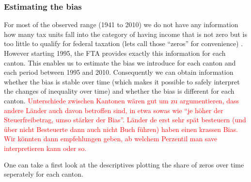 \documentclass[twoside]{article}\usepackage[]{graphicx}\usepackage[]{color}
\begin{document}
\begin{multicols}{2}


\subsubsection{Estimating the bias}
For most of the observed range (1941 to 2010) we do not have any information how many tax units fall into the category of having income that is not zero but is too little to qualify for federal taxation (lets call those ``zeros'' for convenience) . However starting 1995, the FTA provides exactly this information for each canton. This enables us to estimate the bias we introduce for each canton and each period between 1995 and 2010. Consequently we can obtain information whether the bias is stable over time (which makes it possible to safely interpret the changes of inequality over time) and whether the bias is different for each canton. \textcolor{red}{Unterschiede zwischen Kantonen wären gut um zu argumentieren, dass andere Länder auch davon betroffen sind, in etwa sowas wie ``je höher der Steuerfreibetrag, umso stärker der Bias''. Länder de erst sehr spät besteuern (und über nicht Besteuerte dann auch nicht Buch führen) haben einen krassen Bias. Wir könnten dann empfehlungen geben, ab welchem Perzentil man save interpretieren kann oder so.}

One can take a first look at the descriptives plotting the share of zeros over time seperately for each canton.





\end{multicols}
\end{document}
